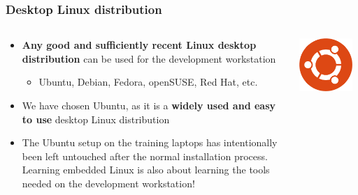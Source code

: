 \begin{frame}
  \frametitle{Desktop Linux distribution}
  \begin{columns}
    \begin{column}{0.7\textwidth}
    \begin{itemize}
    \item {\bf Any good and sufficiently recent Linux desktop
        distribution} can be used for the development workstation
      \begin{itemize}
      \item Ubuntu, Debian, Fedora, openSUSE, Red Hat, etc.
      \end{itemize}
    \item We have chosen Ubuntu, as it is a {\bf widely used and easy to
        use} desktop Linux distribution
    \item The Ubuntu setup on the training laptops has intentionally
      been left untouched after the normal installation
      process. Learning embedded Linux is also about learning the tools
      needed on the development workstation!
    \end{itemize}
    \end{column}
    \begin{column}[t]{0.3\textwidth}
      \includegraphics[width=0.9\textwidth]{slides/sysdev-dev-environment/ubuntu.png}
    \end{column}
  \end{columns}
\end{frame}

